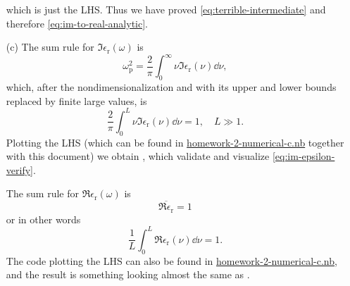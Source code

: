 \documentclass[hyperref, a4paper]{article}
\begin{document}
\begin{itemize}
\[    \]
    which is just the LHS. Thus we have proved \eqref{eq:terrible-intermediate} and therefore \eqref{eq:im-to-real-analytic}. 
    \item[(c)] The sum rule for $\Im \epsilon_\text{r}(\omega)$ is 
    \begin{equation}
        \omega_\text{p}^2 = \frac{2}{\pi} \int_0^\infty \nu \Im \epsilon_\text{r}(\nu) \dd{\nu},
    \end{equation} 
    which, after the nondimensionalization and with its upper and lower bounds replaced by finite large values, is 
    \begin{equation}
        \frac{2}{\pi} \int_0^L \nu \Im \epsilon_\text{r}(\nu) \dd{\nu} = 1, \quad L \gg 1.
        \label{eq:im-epsilon-verify}
    \end{equation}
    Plotting the LHS (which can be found in \href{homework-2-numerical-c.nb}{homework-2-numerical-c.nb} together with this document) we obtain , which validate and visualize \eqref{eq:im-epsilon-verify}.

    The sum rule for $\Re \epsilon_\text{r}(\omega)$ is 
    \begin{equation}
        \overline{\Re \epsilon_\text{r}} = 1
    \end{equation}
    or in other words
    \begin{equation}
        \frac{1}{L} \int_0^L \Re \epsilon_\text{r}(\nu) \dd{\nu} = 1.
    \end{equation}
    The code plotting the LHS can also be found in \href{homework-2-numerical-c.nb}{homework-2-numerical-c.nb}, and the result is something looking almost the same as .
\end{itemize}
\end{document}
